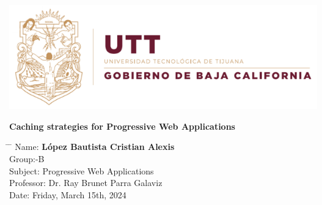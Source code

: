 \documentclass[12pt,a4paper]{article}
\title{}
\author{}
\date{}
\begin{document}
	
	\newcommand{\subf}[2]{%
		{\small\begin{tabular}[t]{@{}c@{}}
				#1\\#2
		\end{tabular}}%
	}
	
	\begin{titlepage}
		\begin{center}
			
			\textbf{}
            \includegraphics[width=1\textwidth]{utt.png}

            \vspace*{3cm}

			\vspace{1.5cm}
			
			\Huge
			\textbf{Caching strategies for Progressive Web Applications}
			
			\vspace{0.8cm}
			\large
			
			\vspace{0.5cm}
			\LARGE
			
			
			\vfill
			
			
			
			\vspace{0.8cm}
			
			
			
			\Large
			
			
			
			
		\end{center}
		\Large
		\begin{tabbing}
			\hspace*{1em}\= \hspace*{8em} \= \kill %
			\> Name:\>  \textbf{López Bautista Cristian Alexis} \\
			\> Group:\>  10-B \\
			\> Subject:\>  Progressive Web Applications  \\
			\> Professor:  \> Dr. Ray Brunet Parra Galaviz \\
			\> Date: \>  Friday, March 15th, 2024
		\end{tabbing}
		
	\end{titlepage}
	
\end{document}
